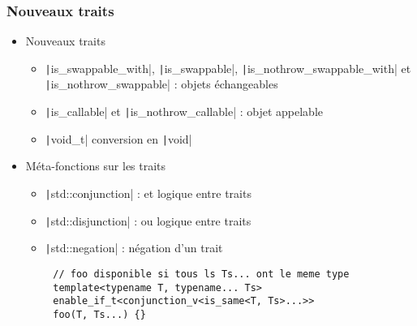 \documentclass[C++.tex]{subfiles}
\begin{document}
\begin{frame}[fragile]
	\frametitle{Nouveaux traits}
	\begin{itemize}
		\item Nouveaux traits
		\begin{itemize}
			\item \texttt|is_swappable_with|, \texttt|is_swappable|, \texttt|is_nothrow_swappable_with| et \texttt|is_nothrow_swappable| : objets échangeables
			\item \texttt|is_callable| et \texttt|is_nothrow_callable| : objet appelable
			\item \texttt|void_t| conversion en \texttt|void|
		\end{itemize}
		\item Méta-fonctions sur les traits
		\begin{itemize}
			\item \texttt|std::conjunction| : et logique entre traits
			\item \texttt|std::disjunction| : ou logique entre traits
			\item \texttt|std::negation| : négation d'un trait
		\end{itemize}
	\end{itemize}

	\begin{verbatim}
		// foo disponible si tous ls Ts... ont le meme type
		template<typename T, typename... Ts>
		enable_if_t<conjunction_v<is_same<T, Ts>...>>
		foo(T, Ts...) {}
	\end{verbatim}


\end{frame}
\end{document}
